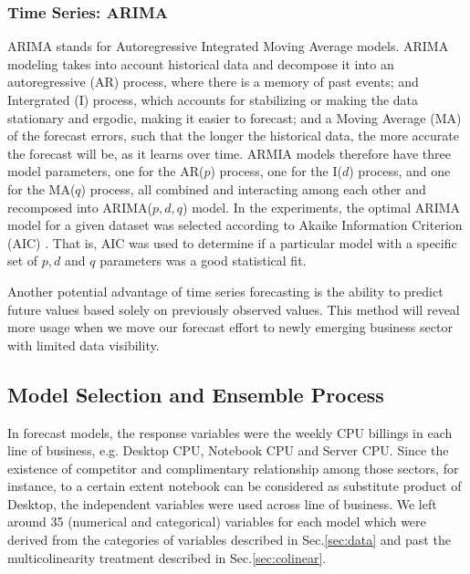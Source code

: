 \documentclass{llncs}
\begin{document}
\subsubsection{Time Series: ARIMA}
ARIMA stands for Autoregressive Integrated Moving Average models. ARIMA modeling takes into account historical data and decompose it into an autoregressive (AR) process, where there is a memory of past events; and Intergrated (I) process, which accounts for stabilizing or making the data stationary and ergodic, making it easier to forecast; and a Moving Average (MA) of the forecast errors, such that the longer the historical data, the more accurate the forecast will be, as it learns over time. ARMIA models therefore have three model parameters, one for the AR($p$) process, one for the I($d$) process, and one for the MA($q$) process, all combined and interacting among each other and recomposed into ARIMA($p,d,q$) model. In the experiments, the optimal ARIMA model for a given dataset was selected according to Akaike Information Criterion (AIC) \cite{Akaike1973}. That is, AIC was used to determine if a particular model with a specific set of $p, d$ and $q$ parameters was a good statistical fit.


Another potential advantage of time series forecasting is the ability to predict future values based solely on previously observed values. This method will reveal more usage when we move our forecast effort to newly emerging business sector with limited data visibility.

\subsection{Model Selection and Ensemble Process}
In forecast models, the response variables were the weekly CPU billings in each line of business, e.g. Desktop CPU, Notebook CPU and Server CPU. Since the existence of competitor and complimentary relationship among those sectors, for instance, to a certain extent notebook can be considered as substitute product of Desktop, the independent variables were used across line of business. We left around 35 (numerical and categorical) variables for each model which were derived from the categories of variables described in Sec.\ref{sec:data} and past the multicolinearity treatment described in Sec.\ref{sec:colinear}. 
\end{document}
